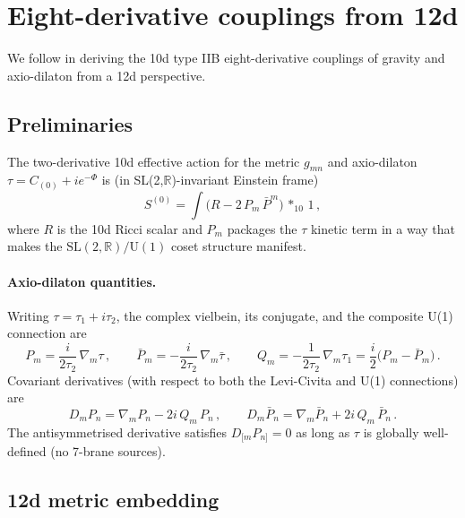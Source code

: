 \section{Eight-derivative couplings from 12d}
\label{sec:12d_eff_act}

We follow \cite{Minasian:2015bxa} in deriving the 10d type IIB eight-derivative
couplings of gravity and axio-dilaton from a 12d perspective.

\subsection{Preliminaries}

The two-derivative 10d effective action for the metric $g_{mn}$ and axio-dilaton
$\tau = C_{(0)} + i e^{-\Phi}$ is (in SL(2,$\mathbb{R}$)-invariant Einstein frame)
\begin{equation}\label{eq:S0}
    S^{(0)} = \int \bigl(R - 2\,P_m\,\bar{P}^m\bigr)\,{*_{10}}\,1\,,
\end{equation}
where $R$ is the 10d Ricci scalar and $P_m$ packages the $\tau$ kinetic term
in a way that makes the $\text{SL}(2,\mathbb{R})/\text{U}(1)$ coset structure manifest.

\paragraph{Axio-dilaton quantities.}
Writing $\tau = \tau_1 + i\tau_2$, the complex vielbein, its conjugate,
and the composite U(1) connection are
\begin{equation}\label{eq:P_Q_def}
    P_m = \frac{i}{2\tau_2}\,\nabla_m\tau\,,\qquad
    \bar{P}_m = -\frac{i}{2\tau_2}\,\nabla_m\bar\tau\,,\qquad
    Q_m = -\frac{1}{2\tau_2}\,\nabla_m\tau_1
        = \frac{i}{2}\bigl(P_m - \bar P_m\bigr)\,.
\end{equation}
Covariant derivatives (with respect to both the Levi-Civita and U(1) connections) are
\begin{equation}\label{eq:D_def}
    D_m P_n = \nabla_m P_n - 2i\,Q_m\,P_n\,,\qquad
    D_m \bar P_n = \nabla_m \bar P_n + 2i\,Q_m\,\bar P_n\,.
\end{equation}
The antisymmetrised derivative satisfies
$D_{[m}P_{n]} = 0$ as long as $\tau$ is globally well-defined
(no 7-brane sources).

\subsection{12d metric embedding}

